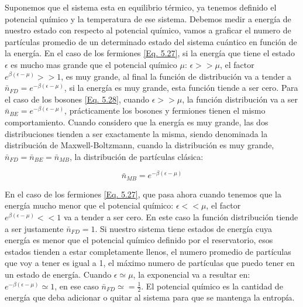\documentclass[11pt,fleqn]{book}
\begin{document}
Suponemos que el sistema esta en equilibrio térmico, ya tenemos definido el potencial químico y la temperatura de ese sistema. Debemos medir a energía de nuestro estado con respecto al potencial químico, vamos a graficar el numero de partículas promedio de un determinado estado del sistema cuántico en función de la energía. En el caso de los fermiones \ref{Eq. 5.27}, si la energía que tiene el estado $\epsilon$ es mucho mas grande que el potencial químico $\mu$: $\epsilon>>\mu$, el factor $e^{\beta(\epsilon-\mu)}>>1$, es muy grande, al final la función de distribución va a tender a $\bar{n}_{FD}=e^{-\beta(\epsilon-\mu)}$, si la energía es muy grande, esta función tiende a ser cero. Para el caso de los bosones \ref{Eq. 5.28}, cuando $\epsilon>>\mu$, la función distribución va a ser $\bar{n}_{BE}=e^{-\beta(\epsilon-\mu)}$, prácticamente los bosones y fermiones tienen el mismo comportamiento. Cuando considero que la energía es muy grande, las dos distribuciones tienden a ser exactamente la misma, siendo denominada la distribución de Maxwell-Boltzmann, cuando la distribución es muy grande, $\bar{n}_{FD}=\bar{n}_{BE}=\bar{n}_{MB}$, la distribución de partículas clásica:

\begin{equation}
    \bar{n}_{MB}=e^{-\beta(\epsilon-\mu)}
    \label{Eq. 5.29}
\end{equation}



En el caso de los fermiones \ref{Eq. 5.27}, que pasa ahora cuando tenemos que la energía mucho menor que el potencial químico: $\epsilon<<\mu$, el factor $e^{\beta(\epsilon-\mu)}<<1$ va a tender a ser cero. En este caso la función distribución tiende a ser justamente $\bar{n}_{FD}=1$. Si nuestro sistema tiene estados de energía cuya energía es menor que el potencial químico definido por el reservatorio, esos estados tienden a estar completamente llenos, el numero promedio de partículas que voy a tener es igual a 1, el máximo numero de partículas que puedo tener en un estado de energía. Cuando $\epsilon\simeq\mu$, la exponencial va a resultar en: $e^{-\beta(\epsilon-\mu)}\simeq1$, en ese caso $\bar{n}_{FD}\simeq=\frac{1}{2}$. El potencial químico es la cantidad de energía que deba adicionar o quitar al sistema para que se mantenga la entropía.
\end{document}
